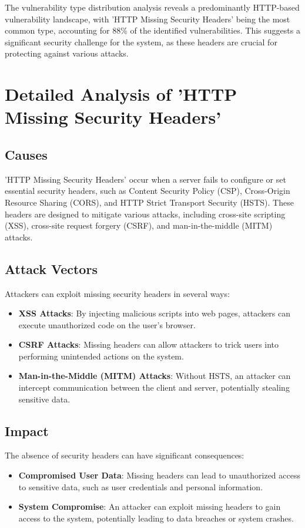 The vulnerability type distribution analysis reveals a predominantly HTTP-based vulnerability landscape, with 'HTTP Missing Security Headers' being the most common type, accounting for 88\% of the identified vulnerabilities. This suggests a significant security challenge for the system, as these headers are crucial for protecting against various attacks.

\section{Detailed Analysis of 'HTTP Missing Security Headers'}

\subsection{Causes}

'HTTP Missing Security Headers' occur when a server fails to configure or set essential security headers, such as Content Security Policy (CSP), Cross-Origin Resource Sharing (CORS), and HTTP Strict Transport Security (HSTS). These headers are designed to mitigate various attacks, including cross-site scripting (XSS), cross-site request forgery (CSRF), and man-in-the-middle (MITM) attacks.

\subsection{Attack Vectors}

Attackers can exploit missing security headers in several ways:
\begin{itemize}
\item \textbf{XSS Attacks}: By injecting malicious scripts into web pages, attackers can execute unauthorized code on the user's browser.
\item \textbf{CSRF Attacks}: Missing headers can allow attackers to trick users into performing unintended actions on the system.
\item \textbf{Man-in-the-Middle (MITM) Attacks}: Without HSTS, an attacker can intercept communication between the client and server, potentially stealing sensitive data.
\end{itemize}
\subsection{Impact}

The absence of security headers can have significant consequences:
\begin{itemize}
\item \textbf{Compromised User Data}: Missing headers can lead to unauthorized access to sensitive data, such as user credentials and personal information.
\item \textbf{System Compromise}: An attacker can exploit missing headers to gain access to the system, potentially leading to data breaches or system crashes.
\end{itemize}
